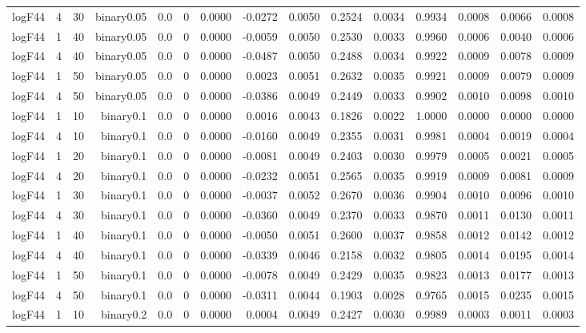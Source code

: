 \begin{longtable}{rrrrrrrrrrrrrrr}
  logF44 & 4 & 30 & binary0.05 & 0.0 & 0 & 0.0000 & -0.0272 & 0.0050 & 0.2524 & 0.0034 & 0.9934 & 0.0008 & 0.0066 & 0.0008 \\ 
  logF44 & 1 & 40 & binary0.05 & 0.0 & 0 & 0.0000 & -0.0059 & 0.0050 & 0.2530 & 0.0033 & 0.9960 & 0.0006 & 0.0040 & 0.0006 \\ 
  logF44 & 4 & 40 & binary0.05 & 0.0 & 0 & 0.0000 & -0.0487 & 0.0050 & 0.2488 & 0.0034 & 0.9922 & 0.0009 & 0.0078 & 0.0009 \\ 
  logF44 & 1 & 50 & binary0.05 & 0.0 & 0 & 0.0000 & 0.0023 & 0.0051 & 0.2632 & 0.0035 & 0.9921 & 0.0009 & 0.0079 & 0.0009 \\ 
  logF44 & 4 & 50 & binary0.05 & 0.0 & 0 & 0.0000 & -0.0386 & 0.0049 & 0.2449 & 0.0033 & 0.9902 & 0.0010 & 0.0098 & 0.0010 \\ 
  logF44 & 1 & 10 & binary0.1 & 0.0 & 0 & 0.0000 & 0.0016 & 0.0043 & 0.1826 & 0.0022 & 1.0000 & 0.0000 & 0.0000 & 0.0000 \\ 
  logF44 & 4 & 10 & binary0.1 & 0.0 & 0 & 0.0000 & -0.0160 & 0.0049 & 0.2355 & 0.0031 & 0.9981 & 0.0004 & 0.0019 & 0.0004 \\ 
  logF44 & 1 & 20 & binary0.1 & 0.0 & 0 & 0.0000 & -0.0081 & 0.0049 & 0.2403 & 0.0030 & 0.9979 & 0.0005 & 0.0021 & 0.0005 \\ 
  logF44 & 4 & 20 & binary0.1 & 0.0 & 0 & 0.0000 & -0.0232 & 0.0051 & 0.2565 & 0.0035 & 0.9919 & 0.0009 & 0.0081 & 0.0009 \\ 
  logF44 & 1 & 30 & binary0.1 & 0.0 & 0 & 0.0000 & -0.0037 & 0.0052 & 0.2670 & 0.0036 & 0.9904 & 0.0010 & 0.0096 & 0.0010 \\ 
  logF44 & 4 & 30 & binary0.1 & 0.0 & 0 & 0.0000 & -0.0360 & 0.0049 & 0.2370 & 0.0033 & 0.9870 & 0.0011 & 0.0130 & 0.0011 \\ 
  logF44 & 1 & 40 & binary0.1 & 0.0 & 0 & 0.0000 & -0.0050 & 0.0051 & 0.2600 & 0.0037 & 0.9858 & 0.0012 & 0.0142 & 0.0012 \\ 
  logF44 & 4 & 40 & binary0.1 & 0.0 & 0 & 0.0000 & -0.0339 & 0.0046 & 0.2158 & 0.0032 & 0.9805 & 0.0014 & 0.0195 & 0.0014 \\ 
  logF44 & 1 & 50 & binary0.1 & 0.0 & 0 & 0.0000 & -0.0078 & 0.0049 & 0.2429 & 0.0035 & 0.9823 & 0.0013 & 0.0177 & 0.0013 \\ 
  logF44 & 4 & 50 & binary0.1 & 0.0 & 0 & 0.0000 & -0.0311 & 0.0044 & 0.1903 & 0.0028 & 0.9765 & 0.0015 & 0.0235 & 0.0015 \\ 
  logF44 & 1 & 10 & binary0.2 & 0.0 & 0 & 0.0000 & 0.0004 & 0.0049 & 0.2427 & 0.0030 & 0.9989 & 0.0003 & 0.0011 & 0.0003 \\ 

\end{longtable}

